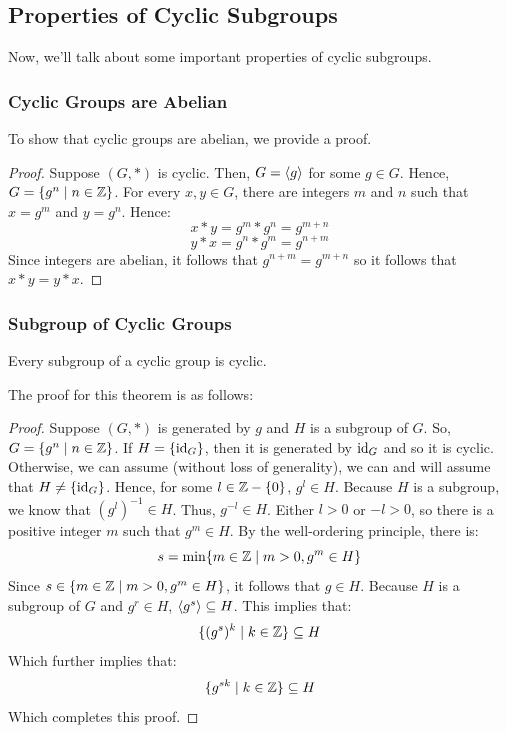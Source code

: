 \documentclass[letterpaper]{article}
\begin{document}
\subsection{Properties of Cyclic Subgroups}
Now, we'll talk about some important properties of cyclic subgroups.

\subsubsection{Cyclic Groups are Abelian}
To show that cyclic groups are abelian, we provide a proof. 
\begin{mdframed}
    \begin{proof}
        Suppose $(G, *)$ is cyclic. Then, $G = \langle g \rangle$ for some $g \in G$. Hence, $G = \{g^n \mid n \in \mathbb{Z}\}$. For every $x, y \in G$, there are integers $m$ and $n$ such that $x = g^m$ and $y = g^n$. Hence: 
        \[x * y = g^m * g^n = g^{m + n}\]
        \[y * x = g^n * g^m = g^{n + m}\]
        Since integers are abelian, it follows that $g^{n + m} = g^{m + n}$ so it follows that $x * y = y * x$.
    \end{proof}
\end{mdframed}

\subsubsection{Subgroup of Cyclic Groups}
\begin{theorem}{}{}
    Every subgroup of a cyclic group is cyclic.
\end{theorem}
The proof for this theorem is as follows: 
\begin{mdframed}
    \begin{proof}
        Suppose $(G, *)$ is generated by $g$ and $H$ is a subgroup of $G$. So, $G = \{g^n \mid n \in \mathbb{Z}\}$. If $H = \{\operatorname{id}_G\}$, then it is generated by $\operatorname{id}_G$ and so it is cyclic. Otherwise, we can assume (without loss of generality), we can and will assume that $H \neq \{\operatorname{id}_G\}$. Hence, for some $l \in \mathbb{Z} - \{0\}$, $g^l \in H$. Because $H$ is a subgroup, we know that $(g^l)^{-1} \in H$. Thus, $g^{-l} \in H$. Either $l > 0$ or $-l > 0$, so there is a positive integer $m$ such that $g^m \in H$. By the well-ordering principle, there is: 
        \[s = \min\{m \in \mathbb{Z} \mid m > 0, g^m \in H\}\]
        Since $s \in \{m \in \mathbb{Z} \mid m > 0, g^m \in H\}$, it follows that $g \in H$. Because $H$ is a subgroup of $G$ and $g^r \in H$, $\langle g^s \rangle \subseteq H$. This implies that: 
        \[\{(g^s)^k \mid k \in \mathbb{Z}\} \subseteq H\]
        Which further implies that: 
        \[\{g^{sk} \mid k \in \mathbb{Z}\} \subseteq H\]
        Which completes this proof.
    \end{proof}
\end{mdframed}
\end{document}

